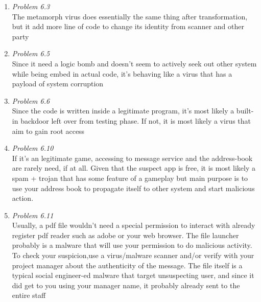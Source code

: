 \documentclass[12pt]{article}
\begin{document}
\begin{enumerate}
    \item \textit{Problem 6.3}\\
    The metamorph virus does essentially the same thing after transformation, but it add more line of code to change its identity from scanner and other party
    \item \textit{Problem 6.5}\\
    Since it need a logic bomb and doesn't seem to actively seek out other system while being embed in actual code, it's behaving like a virus that has a payload of system corruption
    \item \textit{Problem 6.6}\\
    Since the code is written inside a legitimate program, it's most likely a built-in backdoor left over from testing phase. If not, it is most likely a virus that aim to gain root access
    \item\textit{Problem 6.10}\\
    If it's an legitimate game, accessing to message service and the address-book are rarely need, if at all. Given that the suspect app is free, it is most likely a spam + trojan that has some feature of a gameplay but main purpose is to use your address book to propagate itself to other system and start malicious action.
    \item\textit{Problem 6.11}\\
    Usually, a pdf file wouldn't need a special permission to interact with already register pdf reader such as adobe or your web browser. The file launcher probably is a malware that will use your permission to do malicious activity. To check your suspicion,use a virus/malware scanner and/or verify with your project manager about the authenticity of the message. The file itself is a typical social engineer-ed malware that target unsuspecting user, and since it did get to you using your manager name, it probably already sent to the entire staff
\newpage


\end{enumerate}
\end{document}
